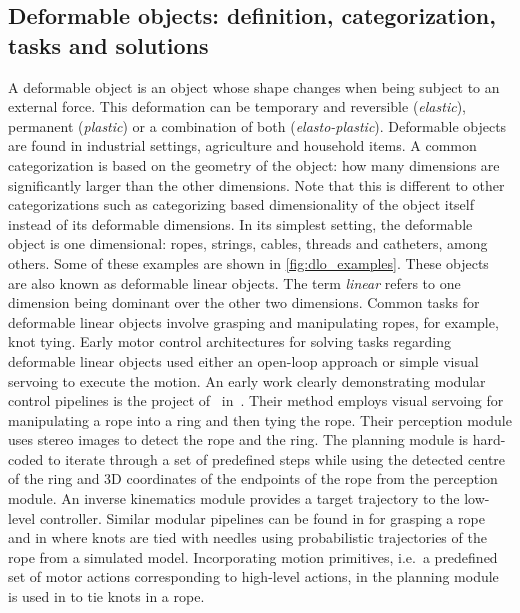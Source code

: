 \subsection{Deformable objects: definition, categorization, tasks and solutions}
A deformable object is an object whose shape changes when being subject to an external force. This deformation can be temporary and reversible (\textit{elastic}), permanent (\textit{plastic}) or a combination of both (\textit{elasto-plastic}). Deformable objects are found in industrial settings, agriculture and household items. A common categorization \autocite{Saadat2002,Jimenez2012} is based on the geometry of the object: how many dimensions are significantly larger than the other dimensions. Note that this is different to other categorizations such as categorizing based dimensionality of the object itself instead of its deformable dimensions.
In its simplest setting, the deformable object is one dimensional: ropes, strings, cables, threads and catheters, among others. Some of these examples are shown in \cref{fig:dlo_examples}. These objects are also known as deformable linear objects. The term \textit{linear} refers to one dimension being dominant over the other two dimensions. Common tasks for deformable linear objects involve grasping and manipulating ropes, for example, knot tying. Early motor control architectures for solving tasks regarding deformable linear objects used either an open-loop approach or simple visual servoing to execute the motion. An early work clearly demonstrating modular control pipelines is the project of~\citeauthor{Inaba1987} in~\citeyear{Inaba1987}. Their method employs visual servoing for manipulating a rope into a ring and then tying the rope. 
Their perception module uses stereo images to detect the rope and the ring. The planning module is hard-coded to iterate through a set of predefined steps while using the detected centre of the ring and 3D coordinates of the endpoints of the rope from the perception module. An inverse kinematics module provides a target trajectory to the low-level controller. Similar modular pipelines can be found in \autocite{Remde1999} for grasping a rope and in \autocite{Saha2007} where knots are tied with needles using probabilistic trajectories of the rope from a simulated model. Incorporating motion primitives, i.e.\ a predefined set of motor actions corresponding to high-level actions, in the planning module is used in \autocite{Yamakawa2008, Vinh2012} to tie knots in a rope.

